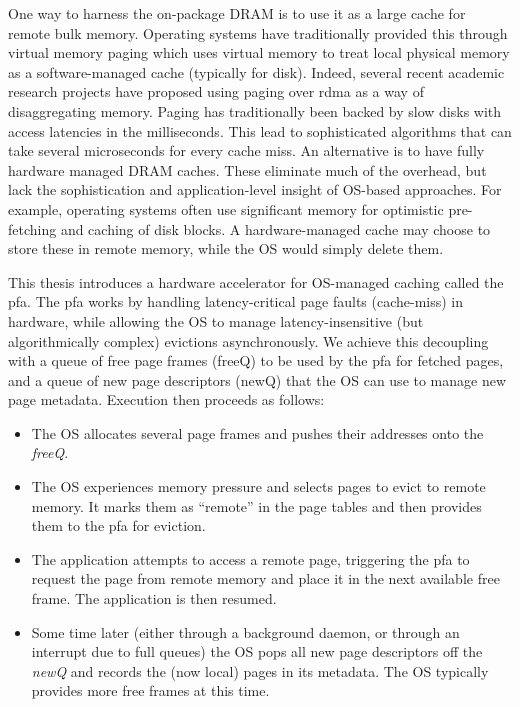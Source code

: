 One way to harness the on-package DRAM is to use it as a large cache for remote
bulk memory. Operating systems have traditionally provided this through virtual
memory \gls{paging} which uses virtual memory to treat local physical memory as
a software-managed cache (typically for disk). Indeed, several recent academic
research projects have proposed using paging over \gls{rdma} as a way of
disaggregating memory\cite{infiniswap}\cite{osdidisag}. Paging has
traditionally been backed by slow disks with access latencies in the
milliseconds. This lead to sophisticated algorithms that can take several
microseconds for every cache miss. An alternative is to have fully hardware
managed DRAM caches\cite{volos_DRAM}\cite{lee_tagless}. These eliminate much of
the overhead, but lack the sophistication and application-level insight of
OS-based approaches. For example, operating systems often use significant
memory for optimistic pre-fetching and caching of disk blocks. A
hardware-managed cache may choose to store these in remote memory, while the OS
would simply delete them.

This thesis introduces a hardware accelerator for OS-managed caching called the
\gls{pfa}. The \gls{pfa} works by handling latency-critical page faults
(cache-miss) in hardware, while allowing the OS to manage latency-insensitive
(but algorithmically complex) evictions asynchronously. We achieve this
decoupling with a queue of free page frames (freeQ) to be used by the \gls{pfa}
for fetched pages, and a queue of new page descriptors (newQ) that the OS can
use to manage new page metadata. Execution then proceeds as follows:

\begin{itemize}
	 \item The OS allocates several page frames and pushes their addresses onto
		 the \emph{freeQ}.
   \item The OS experiences memory pressure and selects pages to evict to
		 remote memory. It marks them as ``remote'' in the page tables and then
     provides them to the \gls{pfa} for eviction.
   \item The application attempts to access a remote page, triggering the
     \gls{pfa}
		 to request the page from remote memory and place it in the next
		 available free frame. The application is then resumed.
	 \item Some time later (either through a background daemon, or through an
		 interrupt due to full queues) the OS pops all new page descriptors off
		 the \emph{newQ} and records the (now local) pages in its metadata. The
		 OS typically provides more free frames at this time.
\end{itemize}


